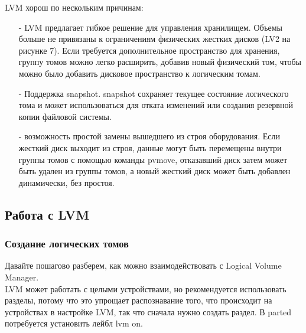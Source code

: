\documentclass[14pt, a4paper]{article}
\begin{document}
LVM хорош по нескольким причинам:
\begin{itemize}
    \item[-] LVM предлагает гибкое решение для управления хранилищем. Объемы больше не привязаны
    к ограничениям физических жестких дисков (LV2 на рисунке 7). Если требуется
    дополнительное пространство для хранения, группу томов можно легко расширить, добавив
    новый физический том, чтобы можно было добавить дисковое пространство к логическим
    томам.
    \item[-] Поддержка snapshot. snapshot сохраняет текущее состояние логического тома и может
    использоваться для отката изменений или создания резервной копии файловой системы.
    \item[-] возможность простой замены вышедшего из строя оборудования. Если жесткий диск выходит
    из строя, данные могут быть перемещены внутри группы томов с помощью команды pvmove,
    отказавший диск затем может быть удален из группы томов, а новый жесткий диск может быть
    добавлен динамически, без простоя.
\end{itemize}

\subsection*{Работа с LVM} 

\subsubsection*{Создание логических томов} 

Давайте пошагово разберем, как можно взаимодействовать с Logical Volume Manager.\\

LVM может работать с целыми устройствами, но рекомендуется использовать разделы, потому что это
упрощает распознавание того, что происходит на устройствах в настройке LVM, так что сначала нужно
создать раздел. В parted потребуется установить лейбл \colorbox{backcolour}{lvm on}.

\vspace{0.3cm}
\end{document}
